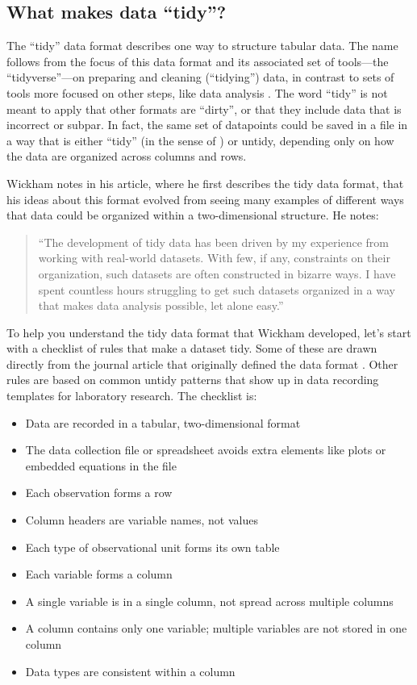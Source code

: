 \documentclass[]{tufte-book}
\providecommand{\tightlist}{%
  \setlength{\itemsep}{0pt}\setlength{\parskip}{0pt}}
\begin{document}
\subsection{What makes data ``tidy''?}\label{what-makes-data-tidy}

The ``tidy'' data format describes one way to structure tabular data. The name
follows from the focus of this data format and its associated set of tools---the
``tidyverse''---on preparing and cleaning (``tidying'') data, in contrast to sets of
tools more focused on other steps, like data analysis \citep{wickham2014tidy}. The
word ``tidy'' is not meant to apply that other formats are ``dirty'', or that they
include data that is incorrect or subpar. In fact, the same set of datapoints
could be saved in a file in a way that is either ``tidy'' (in the sense of
\citep{wickham2014tidy}) or untidy, depending only on how the data are organized
across columns and rows.

Wickham notes in his article, where he first describes the tidy data format,
that his ideas about this format evolved from seeing many examples of
different ways that data could be organized within a two-dimensional structure.
He notes:

\begin{quote}
``The development of tidy data has been driven by my experience from working
with real-world datasets. With few, if any, constraints on their organization,
such datasets are often constructed in bizarre ways. I have spent countless
hours struggling to get such datasets organized in a way that makes data
analysis possible, let alone easy.'' \citep{wickham2014tidy}
\end{quote}

To help you understand the tidy data format that Wickham developed, let's start
with a checklist of rules that make a dataset tidy. Some of these are drawn
directly from the journal article that originally defined the data format
\citep{wickham2014tidy}. Other rules are based on common untidy patterns that show
up in data recording templates for laboratory research. The checklist is:

\begin{itemize}
\tightlist
\item
  Data are recorded in a tabular, two-dimensional format
\item
  The data collection file or spreadsheet avoids extra elements
  like plots or embedded equations in the file
\item
  Each observation forms a row
\item
  Column headers are variable names, not values
\item
  Each type of observational unit forms its own table
\item
  Each variable forms a column
\item
  A single variable is in a single column, not spread across multiple columns
\item
  A column contains only one variable; multiple variables are not stored in one column
\item
  Data types are consistent within a column
\end{itemize}
\end{document}
